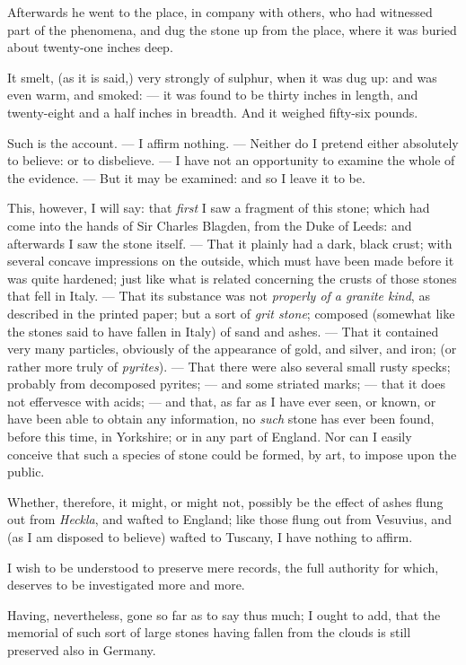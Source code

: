 \documentclass[a4paper, 12pt, oneside]{article}
\begin{document}
Afterwards he went to the place, in company with others, who had witnessed part of the phenomena, and dug the stone up from the place, where it was buried about twenty-one inches deep.

It smelt, (as it is said,) very strongly of sulphur, when it was dug up: and was even warm, and smoked: --- it was found to be thirty inches in length, and twenty-eight and a half inches in breadth. And it weighed fifty-six pounds.

Such is the account. --- I affirm nothing. --- Neither do I pretend either absolutely to believe: or to disbelieve. --- I have not an opportunity to examine the whole of the evidence. --- But it may be examined: and so I leave it to be.

This, however, I will say: that \emph{first} I saw a fragment of this stone; which had come into the hands of Sir Charles Blagden, from the Duke of Leeds: and afterwards I saw the stone itself. --- That it plainly had a dark, black crust; with several concave impressions on the outside, which must have been made before it was quite hardened; just like what is related concerning the crusts of those stones that fell in Italy. --- That its substance was not \emph{properly of a granite kind}, as described in the printed paper; but a sort of \emph{grit stone}; composed (somewhat like the stones said to have fallen in Italy) of sand and ashes. --- That it contained very many particles, obviously of the appearance of gold, and silver, and iron; (or rather more truly of \emph{pyrites}). --- That there were also several small rusty specks; probably from decomposed pyrites; --- and some striated marks; --- that it does not effervesce with acids; --- and that, as far as I have ever seen, or known, or have been able to obtain any information, no \emph{such} stone has ever been found, before this time, in Yorkshire; or in any part of England. Nor can I easily conceive that such a species of stone could be formed, by art, to impose upon the public.

Whether, therefore, it might, or might not, possibly be the effect of ashes flung out from \emph{Heckla}, and wafted to England; like those flung out from Vesuvius, and (as I am disposed to believe) wafted to Tuscany, I have nothing to affirm.

I wish to be understood to preserve mere records, the full authority for which, deserves to be investigated more and more.

Having, nevertheless, gone so far as to say thus much; I ought to add, that the memorial of such sort of large stones having fallen from the clouds is still preserved also in Germany.
\end{document}

